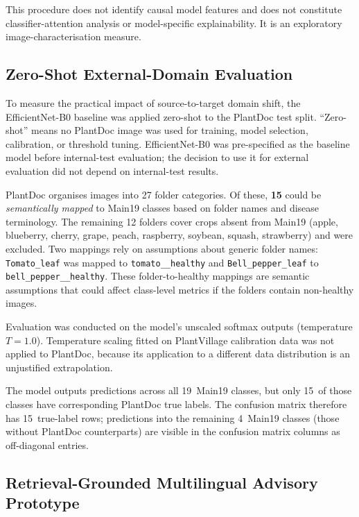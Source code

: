 \documentclass[conference]{IEEEtran}
\begin{document}
This procedure does not identify causal model features and does not
constitute classifier-attention analysis or model-specific
explainability. It is an exploratory image-characterisation measure.

\subsection{Zero-Shot External-Domain Evaluation}
\label{sec:plantdoc_method}

To measure the practical impact of source-to-target domain shift, the
EfficientNet-B0 baseline was applied zero-shot to the PlantDoc test
split. ``Zero-shot'' means no PlantDoc image was used for training,
model selection, calibration, or threshold tuning. EfficientNet-B0 was
pre-specified as the baseline model before internal-test evaluation;
the decision to use it for external evaluation did not depend on
internal-test results.

PlantDoc organises images into 27 folder categories. Of these,
\textbf{15} could be \textit{semantically mapped} to Main19 classes
based on folder names and disease terminology. The remaining 12
folders cover crops absent from Main19 (apple, blueberry, cherry,
grape, peach, raspberry, soybean, squash, strawberry) and were
excluded. Two mappings rely on assumptions about generic folder names:
\texttt{Tomato\_leaf} was mapped to
\texttt{tomato\_\_healthy} and \texttt{Bell\_pepper\_leaf} to
\texttt{bell\_pepper\_\_healthy}. These folder-to-healthy mappings are
semantic assumptions that could affect class-level metrics if the
folders contain non-healthy images.

Evaluation was conducted on the model's unscaled softmax outputs
(temperature $T\!=\!1.0$). Temperature scaling fitted on PlantVillage
calibration data was not applied to PlantDoc, because its application
to a different data distribution is an unjustified extrapolation.

The model outputs predictions across all 19~Main19 classes, but only
15~of those classes have corresponding PlantDoc true labels. The
confusion matrix therefore has 15~true-label rows; predictions into
the remaining 4~Main19 classes (those without PlantDoc counterparts)
are visible in the confusion matrix columns as off-diagonal entries.

\subsection{Retrieval-Grounded Multilingual Advisory Prototype}
\end{document}
